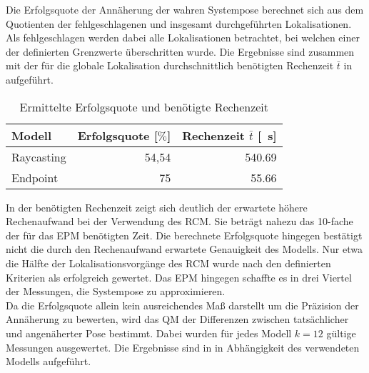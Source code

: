 Die Erfolgsquote der Annäherung der wahren Systempose berechnet sich aus dem Quotienten der fehlgeschlagenen und insgesamt durchgeführten Lokalisationen. Als fehlgeschlagen werden dabei alle Lokalisationen betrachtet, bei welchen einer der definierten Grenzwerte überschritten wurde. Die Ergebnisse sind zusammen mit der für die globale Lokalisation durchschnittlich benötigten Rechenzeit $\bar{t}$ in  aufgeführt.

\begin{table}[ht]
	\centering
	\caption{Ermittelte Erfolgsquote und benötigte Rechenzeit}
	\label{tab.approx_time}
	\vspace*{-3mm}
	\begin{tabular}[ht]{|l|r|r|}\hline
		\rowcolor{Snow2}
		Modell			& Erfolgsquote [$\%$]	&	Rechenzeit $\bar{t}$	 [\SI{}{\second}]	\\ \hline
		Raycasting		& 54,54					&	\SI{540,69}{}			\\ \hline		
		Endpoint			& 75						&	\SI{55,66}{}			\\ \hline
	\end{tabular} 
\end{table}

In der benötigten Rechenzeit zeigt sich deutlich der erwartete höhere Rechenaufwand bei der Verwendung des RCM. Sie beträgt nahezu das \SI{10}{}-fache der für das EPM benötigten Zeit. Die berechnete Erfolgsquote hingegen bestätigt nicht die durch den Rechenaufwand erwartete Genauigkeit des Modells. Nur etwa die Hälfte der Lokalisationsvorgänge des RCM wurde nach den definierten Kriterien als erfolgreich gewertet. Das EPM hingegen schaffte es in drei Viertel der Messungen, die Systempose zu approximieren.\\

%

Da die Erfolgsquote allein kein ausreichendes Maß darstellt um die Präzision der Annäherung zu bewerten, wird das QM der Differenzen zwischen tatsächlicher und angenäherter Pose bestimmt. Dabei wurden für jedes Modell $k=12$ gültige Messungen ausgewertet. Die Ergebnisse sind in  in Abhängigkeit des verwendeten Modells aufgeführt.\\

